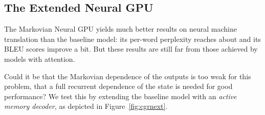 \documentclass{article}
\begin{document}
\subsection{The Extended Neural GPU}


The Markovian Neural GPU yields much better results on neural
machine translation than the baseline model: its per-word
perplexity reaches about  and its BLEU scores improve a bit.
But these results are still far from those achieved by models
with attention.

Could it be that the Markovian dependence of the outputs is too
weak for this problem, that a full recurrent dependence of the state
is needed for good performance? We test this by extending the baseline
model with an \emph{active memory decoder}, as depicted in
Figure~\ref{fig:cgrnext}.
\end{document}
